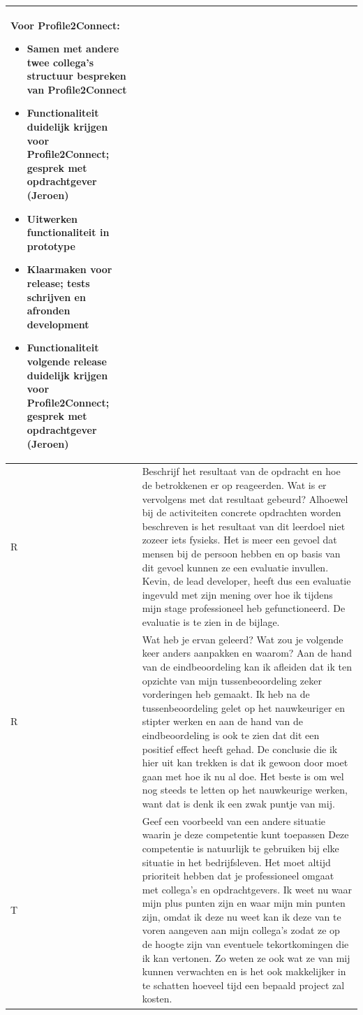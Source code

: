 \begin{tabularx}{\textwidth}{| l | X |}
Voor Profile2Connect:
\begin{itemize}
\item Samen met andere twee collega's structuur bespreken van Profile2Connect
\item Functionaliteit duidelijk krijgen voor Profile2Connect; gesprek met opdrachtgever (Jeroen)
\item Uitwerken functionaliteit in prototype
\item Klaarmaken voor release; tests schrijven en afronden development
\item Functionaliteit volgende release duidelijk krijgen voor Profile2Connect; gesprek met opdrachtgever (Jeroen)
\end{itemize}
\\
\hline
R & Beschrijf het resultaat van de opdracht en hoe de betrokkenen er op reageerden. Wat is er vervolgens met dat resultaat gebeurd?
\newline
\newline
Alhoewel bij de activiteiten concrete opdrachten worden beschreven is het resultaat van dit leerdoel niet zozeer iets fysieks. Het is meer een gevoel dat mensen bij de persoon hebben en op basis van dit gevoel kunnen ze een evaluatie invullen.
Kevin, de lead developer, heeft dus een evaluatie ingevuld met zijn mening over hoe ik tijdens mijn stage professioneel heb gefunctioneerd. De evaluatie is te zien in de bijlage.
\\
\hline
R & Wat heb je ervan geleerd? Wat zou je volgende keer anders aanpakken en waarom?
\newline
\newline
Aan de hand van de eindbeoordeling kan ik afleiden dat ik ten opzichte van mijn tussenbeoordeling zeker vorderingen heb gemaakt. Ik heb na de tussenbeoordeling gelet op het nauwkeuriger en stipter werken en aan de hand van de eindbeoordeling is ook te zien dat dit een positief effect heeft gehad. De conclusie die ik hier uit kan trekken is dat ik gewoon door moet gaan met hoe ik nu al doe. Het beste is om wel nog steeds te letten op het nauwkeurige werken, want dat is denk ik een zwak puntje van mij.
\\
\hline
T & Geef een voorbeeld van een andere situatie waarin je deze competentie kunt toepassen
\newline
\newline
Deze competentie is natuurlijk te gebruiken bij elke situatie in het bedrijfsleven. Het moet altijd prioriteit hebben dat je professioneel omgaat met collega's en opdrachtgevers. Ik weet nu waar mijn plus punten zijn en waar mijn min punten zijn, omdat ik deze nu weet kan ik deze van te voren aangeven aan mijn collega's zodat ze op de hoogte zijn van eventuele tekortkomingen die ik kan vertonen. Zo weten ze ook wat ze van mij kunnen verwachten en is het ook makkelijker in te schatten hoeveel tijd een bepaald project zal kosten.
\\
\hline
\end{tabularx}

